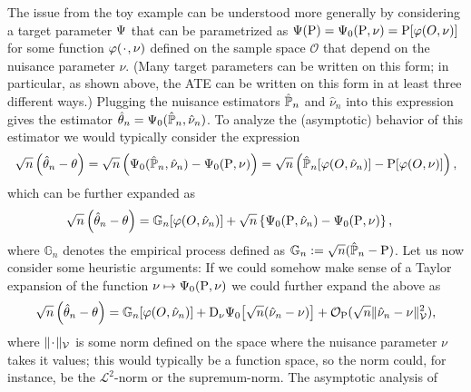 \documentclass[a4,danish]{article}
\begin{document}
The issue from the toy example can be understood more generally by considering a target parameter
$\operatorname{\Psi}$ that can be parametrized as $\operatorname{\Psi}(\mathrm{{P}}) = \operatorname{\Psi}_0(\mathrm{{P}}, \nu) = \mathrm{{P}}[\varphi(O, \nu)]$ for some function
$\phi(\blank, \nu)$ defined on the sample space $\mathcal{O}$ that depend on the nuisance parameter
$\nu$. (Many target parameters can be written on this form; in particular, as shown above, the ATE
can be written on this form in at least three different ways.) Plugging the nuisance estimators
$\hat{\mathbb{P}}_n$ and $\hat{\nu}_n$ into this expression gives the estimator
$\hat{\theta}_n = \operatorname{\Psi}_0(\hat{\mathbb{P}}_n, \hat{\nu}_n)$. To analyze the (asymptotic) behavior of this
estimator we would typically consider the expression
\begin{equation*}
  \sqrt{n}
  \left(
    \hat{\theta}_n - \theta
  \right)
  =  \sqrt{n}
  \left(
    \operatorname{\Psi}_0(\hat{\mathbb{P}}_n,\hat{\nu}_n) - \operatorname{\Psi}_0(\mathrm{{P}},\nu)
  \right) =
  \sqrt{n}
  \left(
    \hat{\mathbb{P}}_n[\varphi(O, \hat{\nu}_n)] -
    \mathrm{{P}}[\varphi(O, \nu)]
  \right),
\end{equation*}
which can be further expanded as
\begin{align*}
  \sqrt{n}
  \left(
  \hat{\theta}_n - \theta
  \right) & =
            {\mathbb{G}_{n}{\left[\varphi( O, \hat{\nu}_n)\right]}}
            + \sqrt{n}
            \left\{
            \operatorname{\Psi}_0(\mathrm{{P}},\hat{\nu}_n) - \operatorname{\Psi}_0(\mathrm{{P}},\nu)
            \right\},
\end{align*}
where $\mathbb{G}_n$ denotes the empirical process defined as
$\mathbb{G}_n := \sqrt{n}(\hat{\mathbb{P}}_n - \mathrm{{P}})$. Let us now consider some heuristic arguments: If we could
somehow make sense of a Taylor expansion of the function $\nu \mapsto \operatorname{\Psi}_0(\mathrm{{P}}, \nu)$ we could
further expand the above as
\begin{equation}
  \label{eq:target-decom}
  \sqrt{n}
  \left(
    \hat{\theta}_n - \theta
  \right)
  = {\mathbb{G}_{n}{\left[\varphi( O, \hat{\nu}_n)\right]}}
  + \mathrm{D_{\nu}{\operatorname{\Psi}_0}}{ \left[
      \sqrt{n}(\hat{\nu}_n - \nu)
    \right]}
  + 
  \mathcal{O}_{\mathrm{{P}}}(\sqrt{n}\Vert \hat{\nu}_n - \nu \Vert_{\mathcal{V}}^2),
\end{equation}
where $\Vert \blank \Vert_{\mathcal{V}}$ is some norm defined on the
space where the nuisance parameter $\nu$ takes it values; this would
typically be a function space, so the norm could, for instance, be the
$\mathcal{L}^2$-norm or the supremum-norm. The asymptotic analysis of
\end{document}
